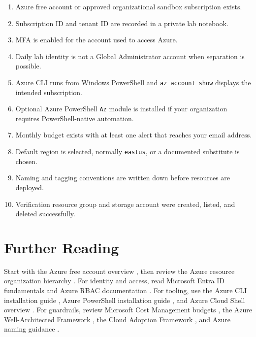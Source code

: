 \begin{enumerate}
    \item Azure free account or approved organizational sandbox subscription exists.
    \item Subscription ID and tenant ID are recorded in a private lab notebook.
    \item MFA is enabled for the account used to access Azure.
    \item Daily lab identity is not a Global Administrator account when separation is possible.
    \item Azure CLI runs from Windows PowerShell and \texttt{az account show} displays the intended subscription.
    \item Optional Azure PowerShell \texttt{Az} module is installed if your organization requires PowerShell-native automation.
    \item Monthly budget exists with at least one alert that reaches your email address.
    \item Default region is selected, normally \texttt{eastus}, or a documented substitute is chosen.
    \item Naming and tagging conventions are written down before resources are deployed.
    \item Verification resource group and storage account were created, listed, and deleted successfully.
\end{enumerate}

\section{Further Reading}
Start with the Azure free account overview \cite{microsoft2025azureFreeAccount}, then review the Azure resource organization hierarchy \cite{microsoft2025accountHierarchy}. For identity and access, read Microsoft Entra ID fundamentals \cite{microsoft2025entra} and Azure RBAC documentation \cite{microsoft2025rbac}. For tooling, use the Azure CLI installation guide \cite{microsoft2025azureCliInstall}, Azure PowerShell installation guide \cite{microsoft2025azurePowerShell}, and Azure Cloud Shell overview \cite{microsoft2025cloudShell}. For guardrails, review Microsoft Cost Management budgets \cite{microsoft2025costBudgets}, the Azure Well-Architected Framework \cite{microsoft2025wellarchitected}, the Cloud Adoption Framework \cite{microsoft2025caf}, and Azure naming guidance \cite{microsoft2025naming}.


